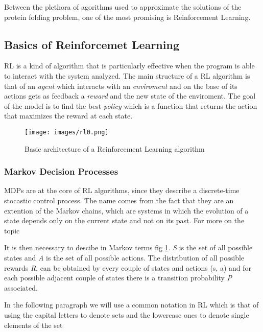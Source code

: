 Between the plethora of agorithms used to approximate the solutions of the protein folding problem, one of the most promising is Reinforcement Learning.

\subsection{Basics of Reinforcemet Learning}

RL is a kind of algorithm that is particularly effective when the program is able to interact with the system analyzed. The main structure of a RL algorithm is that of an \emph{agent} which interacts with an \emph{enviroment} and on the base of its actions gets as feedback a \emph{reward} and the new state of the enviroment. The goal of the model is to find the best \emph{policy} which is a function that returns the action that maximizes the reward at each state.

\FloatBarrier
\begin{figure} [ht!]
    \centering
    \texttt{[image: images/rl0.png]}
    \caption{Basic architecture of a Reinforcement Learning algorithm}
    \label{fig:rl0}
\end{figure}
\FloatBarrier

\subsubsection{Markov Decision Processes}

MDPs are at the core of RL algorithms, since they describe a discrete-time stocastic control process. The name comes from the fact that they are an extention of the Markov chains, which are systems in which the evolution of a state depends only on the current state and not on its past. For more on the topic 


It is then necessary to descibe in Markov terms fig \ref{fig:rl0}. \emph{S} is the set of all possible states and \emph{A} is the set of all possible actions. The distribution of all possible rewards \emph{R}, can be obtained by every couple of states and actions (s, a) and for each possible adjacent couple of states there is a transition probability \emph{P} associated.

In the following paragraph we will use a common notation in RL which is that of using the capital letters to denote sets and the lowercase ones to denote single elements of the set

